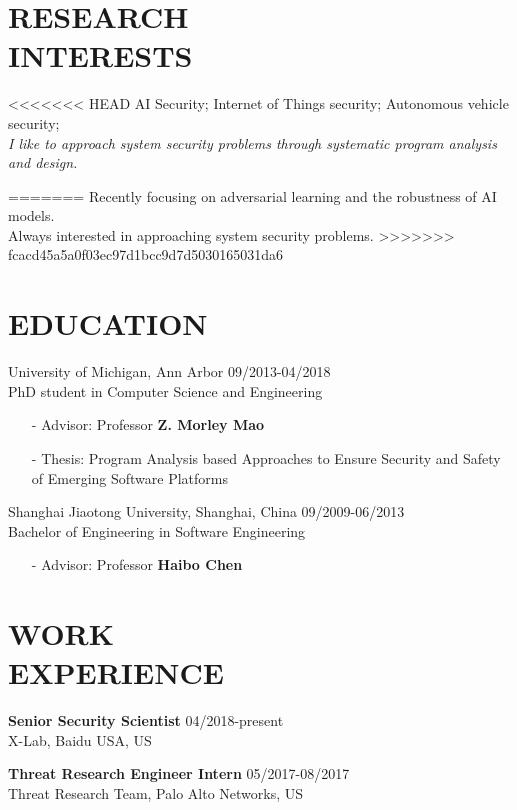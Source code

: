 \documentclass[margin]{res}
\begin{document}
\begin{resume}


\section{RESEARCH \\ INTERESTS}
<<<<<<< HEAD
AI Security; Internet of Things security; Autonomous vehicle security;\\
\textit{I like to approach system security problems through systematic program analysis and design.}



=======
Recently focusing on adversarial learning and the robustness of AI models. \\
Always interested in approaching system security problems. 
>>>>>>> fcacd45a5a0f03ec97d1bcc9d7d5030165031da6

\section{EDUCATION} 
University of Michigan, Ann Arbor \hfill 09/2013-04/2018 \\
PhD student in Computer Science and Engineering
\begin{itemize}
\item[-] Advisor: Professor \textbf{Z. Morley Mao}
\item[-] Thesis: Program Analysis based Approaches to Ensure Security and Safety of Emerging Software Platforms
\end{itemize}

Shanghai Jiaotong University, Shanghai, China \hfill 09/2009-06/2013 \\
Bachelor of Engineering in Software Engineering
\begin{itemize}
\item[-] Advisor: Professor \textbf{Haibo Chen}
\end{itemize}

\section{WORK\\ EXPERIENCE}
\textbf{Senior Security Scientist} \hfill 04/2018-present\\
X-Lab, Baidu USA, US

\textbf{Threat Research Engineer Intern} \hfill 05/2017-08/2017 \\
Threat Research Team, Palo Alto Networks, US


\end{resume}
\end{document}
